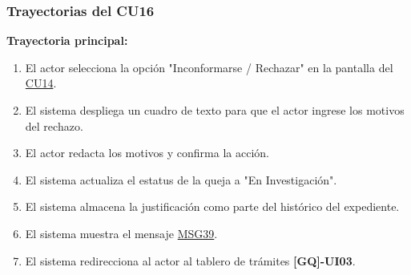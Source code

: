 \begin{appendices}
\subsubsection{Trayectorias del CU16}
\textbf{Trayectoria principal:}
\begin{enumerate}[nosep]
    \item El actor selecciona la opción "Inconformarse / Rechazar" en la pantalla del \hyperlink{anexo:casos_uso}{CU14}.
    \item El sistema despliega un cuadro de texto para que el actor ingrese los motivos del rechazo.
    \item El actor redacta los motivos y confirma la acción.
    \item El sistema actualiza el estatus de la queja a "En Investigación".
    \item El sistema almacena la justificación como parte del histórico del expediente.
    \item El sistema muestra el mensaje \hyperlink{msg:MSG39}{MSG39}.
    \item El sistema redirecciona al actor al tablero de trámites \textbf{[GQ]-UI03}.
\end{enumerate}


\end{appendices}
